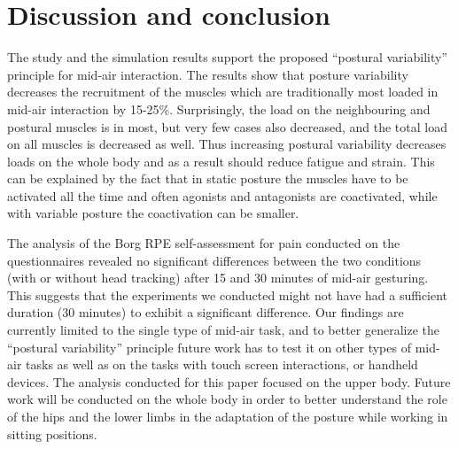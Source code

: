 \section{Discussion and conclusion}



The study and the simulation results support the proposed ``postural variability'' principle for mid-air interaction.
The results show that posture variability decreases the recruitment of the muscles which are traditionally most loaded in mid-air interaction by 15-25\%. 
Surprisingly, the load on the neighbouring and postural muscles is in most, but very few cases also decreased, and the total load on all muscles is decreased as well.
Thus increasing postural variability decreases loads on the whole body and as a result should reduce fatigue and strain. 
This can be explained by the fact that in static posture the muscles have to be activated all the time and often agonists and antagonists are coactivated, while with variable posture the coactivation can be smaller.

The analysis of the Borg RPE self-assessment for pain conducted on the questionnaires revealed no significant differences between the two conditions (with or without head tracking) after 15 and 30 minutes of mid-air gesturing. This suggests that the experiments we conducted might not have had a sufficient duration (30 minutes) to exhibit a significant difference.
Our findings are currently limited to the single type of mid-air task, and to better generalize the ``postural variability'' principle future work has to test it on other types of mid-air tasks as well as on the tasks with touch screen interactions, or handheld devices.
The analysis conducted for this paper focused on the upper body. Future work will be conducted on the whole body in order to better understand the role of the hips and the lower limbs in the adaptation of the posture while working in sitting positions.
